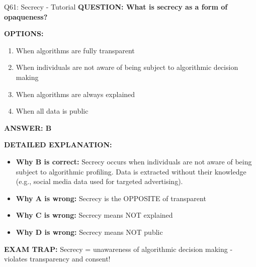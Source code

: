 \documentclass[8pt]{beamer}
\begin{document}
	\begin{frame}{Q61: Secrecy - Tutorial}
		\fontsize{6.5}{7.5}\selectfont
		\textbf{QUESTION: What is secrecy as a form of opaqueness?}
		
		\vspace{0.1cm}
		\textbf{OPTIONS:}
		\begin{enumerate}
			\item When algorithms are fully transparent
			\item When individuals are not aware of being subject to algorithmic decision making
			\item When algorithms are always explained
			\item When all data is public
		\end{enumerate}
		
		\vspace{0.1cm}
		\textcolor{myblue}{\textbf{ANSWER: B}}
		
		\vspace{0.1cm}
		\textbf{DETAILED EXPLANATION:}
		\begin{itemize}
			\item \textbf{Why B is correct:} Secrecy occurs when individuals are not aware of being subject to algorithmic profiling. Data is extracted without their knowledge (e.g., social media data used for targeted advertising).
			\item \textbf{Why A is wrong:} Secrecy is the OPPOSITE of transparent
			\item \textbf{Why C is wrong:} Secrecy means NOT explained
			\item \textbf{Why D is wrong:} Secrecy means NOT public
		\end{itemize}
		
		\textcolor{myred}{\textbf{EXAM TRAP:}} Secrecy = \textcolor{myblue}{unawareness of algorithmic decision making} - violates transparency and consent!
	\end{frame}
	
\end{document}
